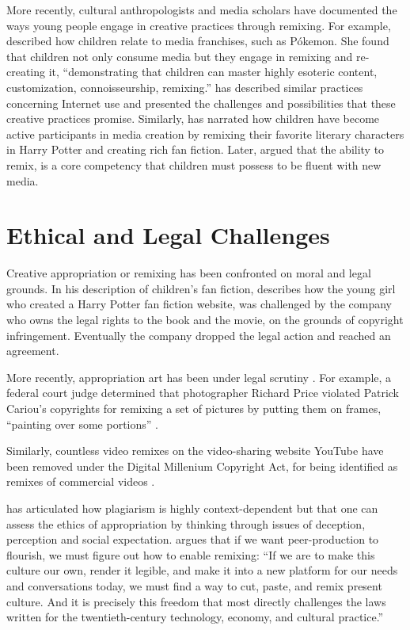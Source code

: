 More recently, cultural anthropologists and media scholars have documented the ways young people engage in creative practices through remixing. 
For example, \citet{ito_technologies_2007} described how children relate to media franchises, such as Pókemon.
She found that children not only consume media but they engage in remixing and re-creating it, ``demonstrating that children can master highly esoteric content, customization, connoisseurship, remixing.''
\citet{livingstone_taking_2008} has described similar practices concerning Internet use and presented the challenges and possibilities that these creative practices promise.
Similarly, \citet{jenkins_convergence_2006} has narrated how children have become active participants in media creation by remixing their favorite literary characters in Harry Potter and creating rich fan fiction.
Later, \citet{jenkins_confronting_2009} argued that the ability to remix, is a core competency that children must possess to be fluent with new media.

\section{Ethical and Legal Challenges}

Creative appropriation or remixing has been confronted on moral and legal grounds.
In his description of children's fan fiction, \citet{jenkins_convergence_2006} describes how the young girl who created a Harry Potter fan fiction website, was challenged by the company who owns the legal rights to the book and the movie, on the grounds of copyright infringement.
Eventually the company dropped the legal action and reached an agreement.

More recently, appropriation art has been under legal scrutiny \citep{greenberg_art_1992,landes_copyright_2000}. 
For example, a federal court judge determined that photographer Richard Price violated Patrick Cariou's copyrights for remixing a set of pictures by putting them on frames, ``painting over some portions'' \citep{batts_patrick_2011}.

Similarly, countless video remixes on the video-sharing website YouTube have been removed under the Digital Millenium Copyright Act, for being identified as remixes of commercial videos \citep{seneviratne_remix_2010}.

\citet{posner_little_2007} has articulated how plagiarism is highly context-dependent but that one can assess the ethics of appropriation by thinking through issues of deception, perception and social expectation.
\citet{benkler_wealth_2006} argues that if we want peer-production to flourish, we must figure out how to enable remixing:
``If we are to make this culture our own, render it legible, and make it into a new platform for our needs and conversations today, we must find a way to cut, paste, and remix present culture. And it is precisely this freedom that most directly challenges the laws written for the twentieth-century technology, economy, and cultural practice.''

